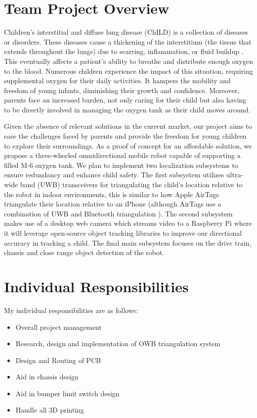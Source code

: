 \documentclass{report}
\begin{document}
    \section{Team Project Overview}
    Children's interstitial and diffuse lung disease (ChILD) is a collection of diseases or disorders. These diseases cause a thickening of the interstitium (the tissue that extends throughout the lungs) due to scarring, inflammation, or fluid buildup \cite{ChILD-2022}. This eventually affects a patient’s ability to breathe and distribute enough oxygen to the blood. Numerous children experience the impact of this situation, requiring supplemental oxygen for their daily activities. It hampers the mobility and freedom of young infants, diminishing their growth and confidence. Moreover, parents face an increased burden, not only caring for their child but also having to be directly involved in managing the oxygen tank as their child moves around.

    Given the absence of relevant solutions in the current market, our project aims to ease the challenges faced by parents and provide the freedom for young children to explore their surroundings. As a proof of concept for an affordable solution, we propose a three-wheeled omnidirectional mobile robot capable of supporting a filled M-6 oxygen tank. We plan to implement two localization subsystems to ensure redundancy and enhance child safety. The first subsystem utilizes ultra-wide band (UWB) transceivers for triangulating the child's location relative to the robot in indoor environments, this is similar to how Apple AirTags triangulate their location relative to an iPhone \cite{airtag_uwb} (although AirTags use a combination of UWB and Bluetooth triangulation \cite{airtag_ble}). The second subsystem makes use of a desktop web camera which streams video to a Raspberry Pi where it will leverage open-source object tracking libraries to improve our directional accuracy in tracking a child. The final main subsystem focuses on the drive train, chassis and close range object detection of the robot.

    \section{Individual Responsibilities}
    My individual responsibilities are as follows:

    \begin{itemize}
        \item Overall project management
        \item Research, design and implementation of OWB triangulation system
        \item Design and Routing of PCB
        \item Aid in chassis design
        \item Aid in bumper limit switch design
        \item Handle all 3D printing
    \end{itemize}
\end{document}
